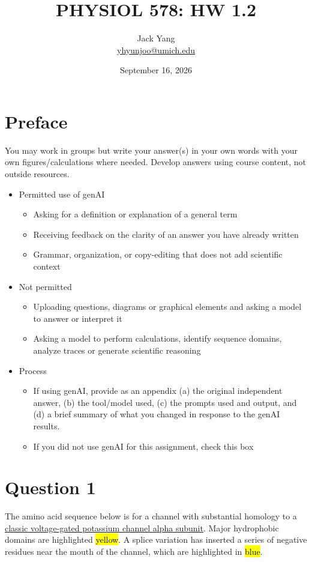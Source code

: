 \documentclass{article}
\title{PHYSIOL 578: HW 1.2}
\author{Jack Yang \\ \href{mailto:yhyunjoo@umich.edu}{yhyunjoo@umich.edu}}
\date{September 16, 2026}
\begin{document}
\maketitle

\section*{Preface}
You may work in groups but write your answer(s) in your own words with your own figures/calculations
where needed. Develop answers using course content, not outside resources.

\begin{itemize}
    \item Permitted use of genAI
    \begin{itemize}
        \item Asking for a definition or explanation of a general term
        \item Receiving feedback on the clarity of an answer you have already written
        \item Grammar, organization, or copy-editing that does not add scientific context
    \end{itemize}
    \item Not permitted
    \begin{itemize}
        \item Uploading questions, diagrams or graphical elements and asking a model to answer or
interpret it
        \item Asking a model to perform calculations, identify sequence domains, analyze traces or
generate scientific reasoning
    \end{itemize}
    \item Process
    \begin{itemize}
        \item If using genAI, provide as an appendix (a) the original independent answer, (b) the
tool/model used, (c) the prompts used and output, and (d) a brief summary of what you
changed in response to the genAI results.
        \item If you did not use genAI for this assignment, check this box
        
    \end{itemize}
\end{itemize}

\section*{Question 1}
The amino acid sequence below is for a channel with substantial homology to a \underline{classic voltage-gated
potassium channel alpha subunit}. Major hydrophobic domains are highlighted \hl{yellow}. A splice variation
has inserted a series of negative residues near the mouth of the channel, which are highlighted in \hl{blue}.
\end{document}
